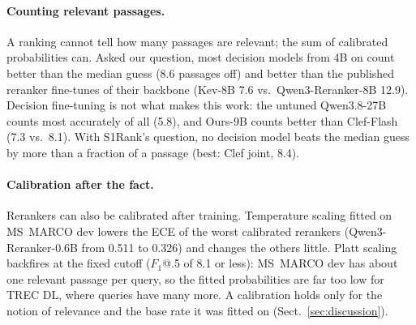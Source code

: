 \paragraph{Counting relevant passages.}
A ranking cannot tell how many passages are relevant; the sum of calibrated probabilities can. Asked our question,
most decision models from 4B on count better than the median guess (8.6 passages off) and better than the published
reranker fine-tunes of their backbone (Kev-8B 7.6 vs.\ Qwen3-Reranker-8B 12.9). Decision fine-tuning is not what makes
this work: the untuned Qwen3.8-27B counts most accurately of all (5.8), and Ours-9B counts better than Clef-Flash (7.3
vs.\ 8.1). With S1Rank's question, no decision model beats the median guess by more than a fraction of a passage
(best: Clef joint, 8.4).

\paragraph{Calibration after the fact.}
Rerankers can also be calibrated after training. Temperature scaling fitted on MS~MARCO dev lowers the ECE of the
worst calibrated rerankers (Qwen3-Reranker-0.6B from 0.511 to 0.326) and changes the others little. Platt scaling
backfires at the fixed cutoff ($F_1$@.5 of 8.1 or less): MS~MARCO dev has about one relevant passage per query, so the
fitted probabilities are far too low for TREC DL, where queries have many more. A calibration holds only for the
notion of relevance and the base rate it was fitted on (Sect.~\ref{sec:discussion}).


